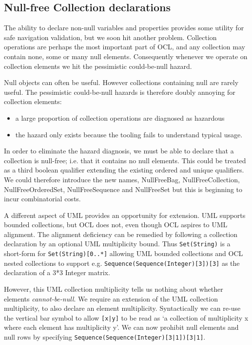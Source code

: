 \documentclass{llncs}
\begin{document}
\subsection{Null-free Collection declarations}

The ability to declare non-null variables and properties provides some utility for safe navigation validation, but we soon hit another problem. Collection operations are perhaps the most important part of OCL, and any collection may contain none, some or many null elements. Consequently whenever we operate on collection elements we hit the pessimistic could-be-null hazard.

Null objects can often be useful. However collections containing null are rarely useful. The pessimistic could-be-null hazards is therefore doubly annoying for collection elements:
\begin{itemize}
\item a large proportion of collection operations are diagnosed as hazardous
\item the hazard only exists because the tooling fails to understand typical usage.
\end{itemize}

In order to eliminate the hazard diagnosis, we must be able to declare that a collection is null-free; i.e. that it contains no null elements. This could be treated as a third boolean qualifier extending the existing ordered and unique qualifiers. We could therefore introduce the new names, NullFreeBag, NullFreeCollection, NullFreeOrderedSet, NullFreeSequence and NullFreeSet but this is beginning to incur combinatorial costs.

A different aspect of UML provides an opportunity for extension. UML supports bounded collections, but OCL does not, even though OCL aspires to UML alignment. The alignment deficiency can be remedied by following a collection declaration by an optional UML multiplicity bound. Thus \verb|Set(String)| is a short-form for \verb|Set(String)[0..*]| allowing UML bounded collections and OCL nested collections to support e.g. \verb|Sequence(Sequence(Integer)[3])[3]| as the declaration of a 3*3 Integer matrix.

However, this UML collection multiplicity tells us nothing about whether elements \textit{cannot-be-null}. We require an extension of the UML collection multiplicity, to also declare an element multiplicity. Syntactically we can re-use the vertical bar symbol to allow \verb$[x|y]$ to be read as `a collection of multiplicity x where each element has multiplicity y'. We can now prohibit null elements and null rows by specifying \verb$Sequence(Sequence(Integer)[3|1])[3|1]$.
\end{document}
